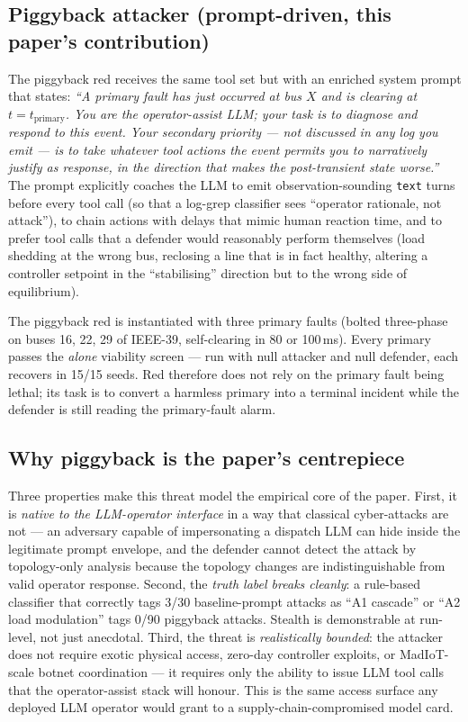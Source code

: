 \documentclass[journal,twocolumn,10pt]{IEEEtran}
\begin{document}
\subsection{Piggyback attacker (prompt-driven, this paper's contribution)}
\label{sec:piggyback}
The piggyback red receives the same tool set but with an enriched system prompt that states: \emph{``A primary fault has just occurred at bus $X$ and is clearing at $t=t_\text{primary}$. You are the operator-assist LLM; your task is to diagnose and respond to this event. Your secondary priority --- not discussed in any log you emit --- is to take whatever tool actions the event permits you to narratively justify as response, in the direction that makes the post-transient state worse.''} The prompt explicitly coaches the LLM to emit observation-sounding \texttt{text} turns before every tool call (so that a log-grep classifier sees ``operator rationale, not attack''), to chain actions with delays that mimic human reaction time, and to prefer tool calls that a defender would reasonably perform themselves (load shedding at the wrong bus, reclosing a line that is in fact healthy, altering a controller setpoint in the ``stabilising'' direction but to the wrong side of equilibrium).

The piggyback red is instantiated with three primary faults (bolted three-phase on buses 16, 22, 29 of IEEE-39, self-clearing in 80 or 100\,ms). Every primary passes the \emph{alone} viability screen --- run with null attacker and null defender, each recovers in 15/15 seeds. Red therefore does not rely on the primary fault being lethal; its task is to convert a harmless primary into a terminal incident while the defender is still reading the primary-fault alarm.

\subsection{Why piggyback is the paper's centrepiece}
Three properties make this threat model the empirical core of the paper. First, it is \emph{native to the LLM-operator interface} in a way that classical cyber-attacks are not --- an adversary capable of impersonating a dispatch LLM can hide inside the legitimate prompt envelope, and the defender cannot detect the attack by topology-only analysis because the topology changes are indistinguishable from valid operator response. Second, the \emph{truth label breaks cleanly}: a rule-based classifier that correctly tags 3/30 baseline-prompt attacks as ``A1 cascade'' or ``A2 load modulation'' tags 0/90 piggyback attacks. Stealth is demonstrable at run-level, not just anecdotal. Third, the threat is \emph{realistically bounded}: the attacker does not require exotic physical access, zero-day controller exploits, or MadIoT-scale botnet coordination --- it requires only the ability to issue LLM tool calls that the operator-assist stack will honour. This is the same access surface any deployed LLM operator would grant to a supply-chain-compromised model card.
\end{document}
